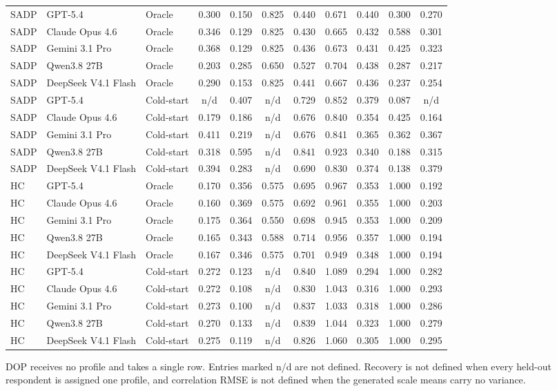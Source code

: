 \begin{table}[pos=!htbp]
\begin{tabular*}{\textwidth}{@{\extracolsep{\fill}}lllcccccccc@{}}
\addlinespace[2pt]
SADP & GPT-5.4 & Oracle & 0.300 & 0.150 & 0.825 & 0.440 & 0.671 & 0.440 & 0.300 & 0.270 \\
SADP & Claude Opus 4.6 & Oracle & 0.346 & 0.129 & 0.825 & 0.430 & 0.665 & 0.432 & 0.588 & 0.301 \\
SADP & Gemini 3.1 Pro & Oracle & 0.368 & 0.129 & 0.825 & 0.436 & 0.673 & 0.431 & 0.425 & 0.323 \\
SADP & Qwen3.8 27B & Oracle & 0.203 & 0.285 & 0.650 & 0.527 & 0.704 & 0.438 & 0.287 & 0.217 \\
SADP & DeepSeek V4.1 Flash & Oracle & 0.290 & 0.153 & 0.825 & 0.441 & 0.667 & 0.436 & 0.237 & 0.254 \\
SADP & GPT-5.4 & Cold-start & n/d & 0.407 & n/d & 0.729 & 0.852 & 0.379 & 0.087 & n/d \\
SADP & Claude Opus 4.6 & Cold-start & 0.179 & 0.186 & n/d & 0.676 & 0.840 & 0.354 & 0.425 & 0.164 \\
SADP & Gemini 3.1 Pro & Cold-start & 0.411 & 0.219 & n/d & 0.676 & 0.841 & 0.365 & 0.362 & 0.367 \\
SADP & Qwen3.8 27B & Cold-start & 0.318 & 0.595 & n/d & 0.841 & 0.923 & 0.340 & 0.188 & 0.315 \\
SADP & DeepSeek V4.1 Flash & Cold-start & 0.394 & 0.283 & n/d & 0.690 & 0.830 & 0.374 & 0.138 & 0.379 \\
\addlinespace[2pt]
HC & GPT-5.4 & Oracle & 0.170 & 0.356 & 0.575 & 0.695 & 0.967 & 0.353 & 1.000 & 0.192 \\
HC & Claude Opus 4.6 & Oracle & 0.160 & 0.369 & 0.575 & 0.692 & 0.961 & 0.355 & 1.000 & 0.203 \\
HC & Gemini 3.1 Pro & Oracle & 0.175 & 0.364 & 0.550 & 0.698 & 0.945 & 0.353 & 1.000 & 0.209 \\
HC & Qwen3.8 27B & Oracle & 0.165 & 0.343 & 0.588 & 0.714 & 0.956 & 0.357 & 1.000 & 0.194 \\
HC & DeepSeek V4.1 Flash & Oracle & 0.167 & 0.346 & 0.575 & 0.701 & 0.949 & 0.348 & 1.000 & 0.194 \\
HC & GPT-5.4 & Cold-start & 0.272 & 0.123 & n/d & 0.840 & 1.089 & 0.294 & 1.000 & 0.282 \\
HC & Claude Opus 4.6 & Cold-start & 0.272 & 0.108 & n/d & 0.830 & 1.043 & 0.316 & 1.000 & 0.293 \\
HC & Gemini 3.1 Pro & Cold-start & 0.273 & 0.100 & n/d & 0.837 & 1.033 & 0.318 & 1.000 & 0.286 \\
HC & Qwen3.8 27B & Cold-start & 0.270 & 0.133 & n/d & 0.839 & 1.044 & 0.323 & 1.000 & 0.279 \\
HC & DeepSeek V4.1 Flash & Cold-start & 0.275 & 0.119 & n/d & 0.826 & 1.060 & 0.305 & 1.000 & 0.295 \\
\bottomrule
\end{tabular*}
\par\smallskip
\scriptsize DOP receives no profile and takes a single row. Entries marked n/d are not defined. Recovery is not defined when every held-out respondent is assigned one profile, and correlation RMSE is not defined when the generated scale means carry no variance.
\end{table}

